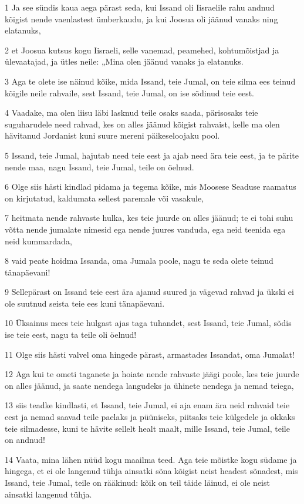\par 1 Ja see sündis kaua aega pärast seda, kui Issand oli Iisraelile rahu andnud kõigist nende vaenlastest ümberkaudu, ja kui Joosua oli jäänud vanaks ning elatanuks,
\par 2 et Joosua kutsus kogu Iisraeli, selle vanemad, peamehed, kohtumõistjad ja ülevaatajad, ja ütles neile: „Mina olen jäänud vanaks ja elatanuks.
\par 3 Aga te olete ise näinud kõike, mida Issand, teie Jumal, on teie silma ees teinud kõigile neile rahvaile, sest Issand, teie Jumal, on ise sõdinud teie eest.
\par 4 Vaadake, ma olen liisu läbi lasknud teile osaks saada, pärisosaks teie suguharudele need rahvad, kes on alles jäänud kõigist rahvaist, kelle ma olen hävitanud Jordanist kuni suure mereni päikeseloojaku pool.
\par 5 Issand, teie Jumal, hajutab need teie eest ja ajab need ära teie eest, ja te pärite nende maa, nagu Issand, teie Jumal, teile on öelnud.
\par 6 Olge siis hästi kindlad pidama ja tegema kõike, mis Moosese Seaduse raamatus on kirjutatud, kaldumata sellest paremale või vasakule,
\par 7 heitmata nende rahvaste hulka, kes teie juurde on alles jäänud; te ei tohi suhu võtta nende jumalate nimesid ega nende juures vanduda, ega neid teenida ega neid kummardada,
\par 8 vaid peate hoidma Issanda, oma Jumala poole, nagu te seda olete teinud tänapäevani!
\par 9 Sellepärast on Issand teie eest ära ajanud suured ja vägevad rahvad ja ükski ei ole suutnud seista teie ees kuni tänapäevani.
\par 10 Üksainus mees teie hulgast ajas taga tuhandet, sest Issand, teie Jumal, sõdis ise teie eest, nagu ta teile oli öelnud!
\par 11 Olge siis hästi valvel oma hingede pärast, armastades Issandat, oma Jumalat!
\par 12 Aga kui te ometi taganete ja hoiate nende rahvaste jäägi poole, kes teie juurde on alles jäänud, ja saate nendega langudeks ja ühinete nendega ja nemad teiega,
\par 13 siis teadke kindlasti, et Issand, teie Jumal, ei aja enam ära neid rahvaid teie eest ja nemad saavad teile paelaks ja püüniseks, piitsaks teie külgedele ja okkaks teie silmadesse, kuni te hävite sellelt healt maalt, mille Issand, teie Jumal, teile on andnud!
\par 14 Vaata, mina lähen nüüd kogu maailma teed. Aga teie mõistke kogu südame ja hingega, et ei ole langenud tühja ainsatki sõna kõigist neist headest sõnadest, mis Issand, teie Jumal, teile on rääkinud: kõik on teil täide läinud, ei ole neist ainsatki langenud tühja.
